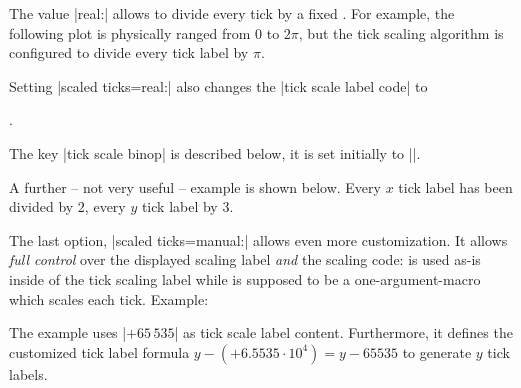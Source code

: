 \begin{pgfplotsxykeylist}
	The value |real:| allows to divide every tick by a fixed .
	For example, the following plot is physically ranged from $0$ to $2\pi$, but the tick scaling algorithm is configured to divide every tick label by $\pi$.
\begin{codeexample}[]
\end{codeexample}
	\noindent Setting |scaled ticks=real:| also changes the |tick scale label code| to
\begin{codeexample}
.
\end{codeexample}
\noindent The key |tick scale binop| is described below, it is set initially to |\cdot|.

A further -- not very useful -- example is shown below. Every $x$ tick label has been divided by $2$, every $y$ tick label by $3$.
\nobreak
\begin{codeexample}[]
\end{codeexample}

	The last option, |scaled ticks=manual:| allows even more customization. It allows \emph{full control} over the displayed scaling label \emph{and} the scaling code:  is used as-is inside of the tick scaling label while  is supposed to be a one-argument-macro which scales each tick. Example:
\begin{codeexample}[]
\end{codeexample}
\noindent The example uses |$+65\,535$| as tick scale label content. Furthermore, it defines the customized tick label formula $y - (+6.5535\cdot 10^4) = y - 65535$ to generate $y$ tick labels.


\end{pgfplotsxykeylist}
